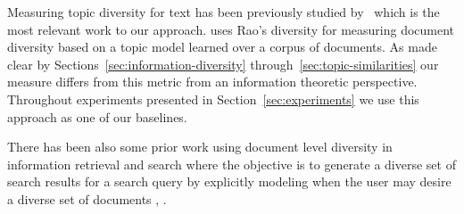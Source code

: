 Measuring topic diversity for text has been previously studied by~\cite{bache:2013} which is the most relevant work to our approach. \cite{bache:2013} uses Rao's diversity \cite{rao:1982} for measuring document diversity based on a topic model learned over a corpus of documents. As made clear by Sections~\ref{sec:information-diversity} through~\ref{sec:topic-similarities} our measure differs from this metric from an information theoretic perspective. Throughout experiments presented in Section~\ref{sec:experiments} we use this approach as one of our baselines. 

There has been also some prior work using document level diversity in information retrieval and search where the objective is to generate a diverse set of search results for a search query by explicitly modeling when the user may desire a diverse set of documents \cite{Welch:2011:SRD:1963405.1963441}, \cite{Gillenwater12discoveringdiverse}. 


